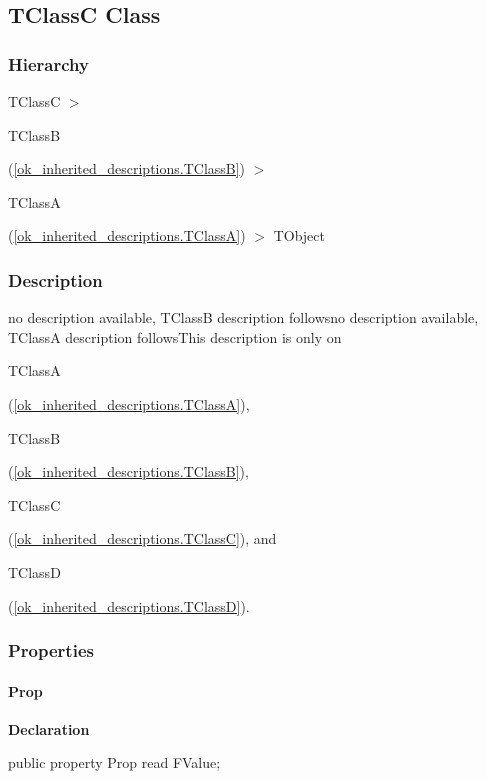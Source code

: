 \documentclass{report}
\begin{document}
\subsection*{TClassC Class}
\subsubsection*{\large{\textbf{Hierarchy}}\normalsize\hspace{1ex}\hfill}
TClassC {$>$} \begin{ttfamily}TClassB\end{ttfamily}(\ref{ok_inherited_descriptions.TClassB}) {$>$} \begin{ttfamily}TClassA\end{ttfamily}(\ref{ok_inherited_descriptions.TClassA}) {$>$} 
TObject
\subsubsection*{\large{\textbf{Description}}\normalsize\hspace{1ex}\hfill}
no description available, TClassB description followsno description available, TClassA description followsThis description is only on \begin{ttfamily}TClassA\end{ttfamily}(\ref{ok_inherited_descriptions.TClassA}), \begin{ttfamily}TClassB\end{ttfamily}(\ref{ok_inherited_descriptions.TClassB}), \begin{ttfamily}TClassC\end{ttfamily}(\ref{ok_inherited_descriptions.TClassC}), and \begin{ttfamily}TClassD\end{ttfamily}(\ref{ok_inherited_descriptions.TClassD}).\subsubsection*{\large{\textbf{Properties}}\normalsize\hspace{1ex}\hfill}
\paragraph*{Prop}\hspace*{\fill}

\begin{list}{}{
\setlength{\itemindent}{0cm}
\setlength{\listparindent}{0cm}
\setlength{\leftmargin}{\evensidemargin}
\addtolength{\leftmargin}{\tmplength}
\settowidth{\labelsep}{X}
\addtolength{\leftmargin}{\labelsep}
\setlength{\labelwidth}{\tmplength}
}
\begin{flushleft}
\item[\textbf{Declaration}\hfill]
\begin{ttfamily}
public property Prop read FValue;\end{ttfamily}


\end{flushleft}
\end{list}
\end{document}
